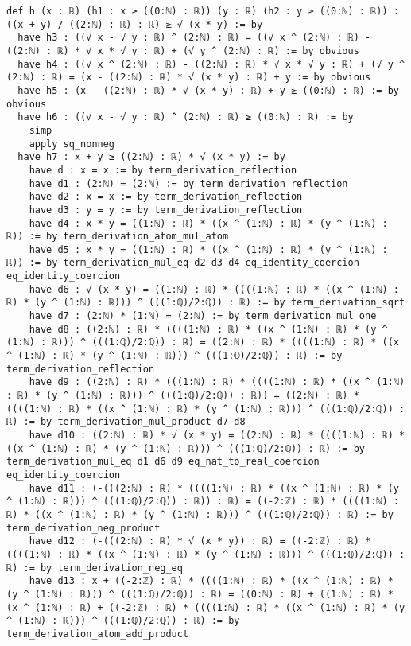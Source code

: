 \documentclass{article}
\begin{document}
\begin{tcolorbox}[colback=white!10, width=\linewidth]
\begin{lstlisting}[language=Lean4]
def h (x : ℝ) (h1 : x ≥ ((0:ℕ) : ℝ)) (y : ℝ) (h2 : y ≥ ((0:ℕ) : ℝ)) : ((x + y) / ((2:ℕ) : ℝ) : ℝ) ≥ √ (x * y) := by
  have h3 : ((√ x - √ y : ℝ) ^ (2:ℕ) : ℝ) = ((√ x ^ (2:ℕ) : ℝ) - ((2:ℕ) : ℝ) * √ x * √ y : ℝ) + (√ y ^ (2:ℕ) : ℝ) := by obvious
  have h4 : ((√ x ^ (2:ℕ) : ℝ) - ((2:ℕ) : ℝ) * √ x * √ y : ℝ) + (√ y ^ (2:ℕ) : ℝ) = (x - ((2:ℕ) : ℝ) * √ (x * y) : ℝ) + y := by obvious
  have h5 : (x - ((2:ℕ) : ℝ) * √ (x * y) : ℝ) + y ≥ ((0:ℕ) : ℝ) := by obvious
  have h6 : ((√ x - √ y : ℝ) ^ (2:ℕ) : ℝ) ≥ ((0:ℕ) : ℝ) := by
    simp
    apply sq_nonneg
  have h7 : x + y ≥ ((2:ℕ) : ℝ) * √ (x * y) := by
    have d : x = x := by term_derivation_reflection
    have d1 : (2:ℕ) = (2:ℕ) := by term_derivation_reflection
    have d2 : x = x := by term_derivation_reflection
    have d3 : y = y := by term_derivation_reflection
    have d4 : x * y = ((1:ℕ) : ℝ) * ((x ^ (1:ℕ) : ℝ) * (y ^ (1:ℕ) : ℝ)) := by term_derivation_atom_mul_atom
    have d5 : x * y = ((1:ℕ) : ℝ) * ((x ^ (1:ℕ) : ℝ) * (y ^ (1:ℕ) : ℝ)) := by term_derivation_mul_eq d2 d3 d4 eq_identity_coercion eq_identity_coercion
    have d6 : √ (x * y) = ((1:ℕ) : ℝ) * ((((1:ℕ) : ℝ) * ((x ^ (1:ℕ) : ℝ) * (y ^ (1:ℕ) : ℝ))) ^ (((1:ℚ)/2:ℚ)) : ℝ) := by term_derivation_sqrt
    have d7 : (2:ℕ) * (1:ℕ) = (2:ℕ) := by term_derivation_mul_one
    have d8 : ((2:ℕ) : ℝ) * ((((1:ℕ) : ℝ) * ((x ^ (1:ℕ) : ℝ) * (y ^ (1:ℕ) : ℝ))) ^ (((1:ℚ)/2:ℚ)) : ℝ) = ((2:ℕ) : ℝ) * ((((1:ℕ) : ℝ) * ((x ^ (1:ℕ) : ℝ) * (y ^ (1:ℕ) : ℝ))) ^ (((1:ℚ)/2:ℚ)) : ℝ) := by term_derivation_reflection
    have d9 : ((2:ℕ) : ℝ) * (((1:ℕ) : ℝ) * ((((1:ℕ) : ℝ) * ((x ^ (1:ℕ) : ℝ) * (y ^ (1:ℕ) : ℝ))) ^ (((1:ℚ)/2:ℚ)) : ℝ)) = ((2:ℕ) : ℝ) * ((((1:ℕ) : ℝ) * ((x ^ (1:ℕ) : ℝ) * (y ^ (1:ℕ) : ℝ))) ^ (((1:ℚ)/2:ℚ)) : ℝ) := by term_derivation_mul_product d7 d8
    have d10 : ((2:ℕ) : ℝ) * √ (x * y) = ((2:ℕ) : ℝ) * ((((1:ℕ) : ℝ) * ((x ^ (1:ℕ) : ℝ) * (y ^ (1:ℕ) : ℝ))) ^ (((1:ℚ)/2:ℚ)) : ℝ) := by term_derivation_mul_eq d1 d6 d9 eq_nat_to_real_coercion eq_identity_coercion
    have d11 : (-(((2:ℕ) : ℝ) * ((((1:ℕ) : ℝ) * ((x ^ (1:ℕ) : ℝ) * (y ^ (1:ℕ) : ℝ))) ^ (((1:ℚ)/2:ℚ)) : ℝ)) : ℝ) = ((-2:ℤ) : ℝ) * ((((1:ℕ) : ℝ) * ((x ^ (1:ℕ) : ℝ) * (y ^ (1:ℕ) : ℝ))) ^ (((1:ℚ)/2:ℚ)) : ℝ) := by term_derivation_neg_product
    have d12 : (-(((2:ℕ) : ℝ) * √ (x * y)) : ℝ) = ((-2:ℤ) : ℝ) * ((((1:ℕ) : ℝ) * ((x ^ (1:ℕ) : ℝ) * (y ^ (1:ℕ) : ℝ))) ^ (((1:ℚ)/2:ℚ)) : ℝ) := by term_derivation_neg_eq
    have d13 : x + ((-2:ℤ) : ℝ) * ((((1:ℕ) : ℝ) * ((x ^ (1:ℕ) : ℝ) * (y ^ (1:ℕ) : ℝ))) ^ (((1:ℚ)/2:ℚ)) : ℝ) = ((0:ℕ) : ℝ) + ((1:ℕ) : ℝ) * (x ^ (1:ℕ) : ℝ) + ((-2:ℤ) : ℝ) * ((((1:ℕ) : ℝ) * ((x ^ (1:ℕ) : ℝ) * (y ^ (1:ℕ) : ℝ))) ^ (((1:ℚ)/2:ℚ)) : ℝ) := by term_derivation_atom_add_product

\end{lstlisting}
\end{tcolorbox}
\end{document}
